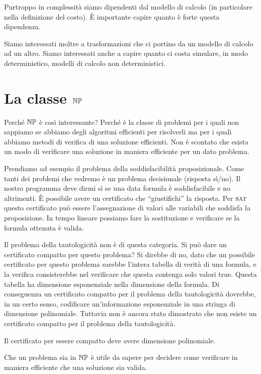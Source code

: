 Purtroppo in complessità siamo dipendenti dal modello di calcolo (in particolare nella definizione
del costo). È importante capire quanto è forte questa dipendenza.

Siamo interessati inoltre a trasformazioni che ci portino da un modello di calcolo ad un altro.
Siamo interessati anche a capire quanto ci costa simulare, in modo deterministico, modelli di
calcolo non deterministici.

\section{La classe $\mathbb{NP}$}

Perché $\mathbb{NP}$ è così interessante? Perché è la classe di problemi per i quali non sappiamo se
abbiamo degli algoritmi efficienti per risolverli ma per i quali abbiamo metodi di verifica di una
soluzione efficienti. Non è scontato che esista un modo di verificare una soluzione in maniera
efficiente per un dato problema.

Prendiamo ad esempio il problema della soddisfacibilità proposizionale. Come tanti dei problemi che
vedremo è un problema decisionale (risposta sì/no). Il nostro programma deve dirmi sì se una data
formula è soddisfacibile e no altrimenti. È possibile avere un certificato che ``giustifichi'' la
risposta. Per $\textsc{sat}$ questo certificato può essere l'assegnazione di valori alle variabili che
soddisfa la proposizione. In tempo lineare possiamo fare la sostituzione e verificare se la formula
ottenuta è valida.

Il problema della tautologicità non è di questa categoria. Si può dare un certificato compatto per
questo problema? Si direbbe di no, dato che un possibile certificato per questo problema sarebbe
l'intera tabella di verità di una formula, e la verifica consisterebbe nel verificare che questa
contenga solo valori true. Questa tabella ha dimensione esponenziale nella dimensione della formula.
Di conseguenza un certificato compatto per il problema della tautologicità dovrebbe, in un certo
senso, codificare un'informazione esponenziale in una stringa di dimensione polinomiale. Tuttavia
non è ancora stato dimostrato che non esiste un certificato compatto per il problema della
tautologicità.

Il certificato per essere compatto deve avere dimensione polinomiale.

Che un problema sia in $\mathbb{NP}$ è utile da sapere per decidere come verificare in maniera efficiente che
una soluzione sia valida.

